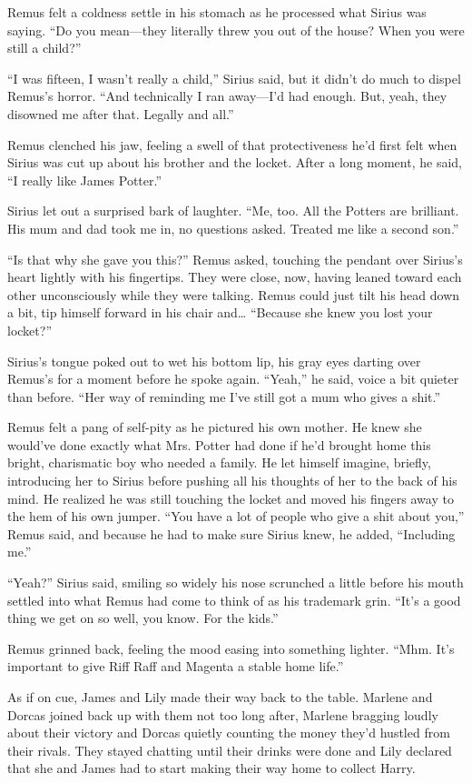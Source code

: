 Remus felt a coldness settle in his stomach as he processed what Sirius was saying. “Do you mean—they literally threw you out of the house? When you were still a child?”

“I was fifteen, I wasn’t really a child,” Sirius said, but it didn’t do much to dispel Remus’s horror. “And technically I ran away—I’d had enough. But, yeah, they disowned me after that. Legally and all.”

Remus clenched his jaw, feeling a swell of that protectiveness he’d first felt when Sirius was cut up about his brother and the locket. After a long moment, he said, “I really like James Potter.”

Sirius let out a surprised bark of laughter. “Me, too. All the Potters are brilliant. His mum and dad took me in, no questions asked. Treated me like a second son.”

“Is that why she gave you this?” Remus asked, touching the pendant over Sirius’s heart lightly with his fingertips. They were close, now, having leaned toward each other unconsciously while they were talking. Remus could just tilt his head down a bit, tip himself forward in his chair and… “Because she knew you lost your locket?”

Sirius’s tongue poked out to wet his bottom lip, his gray eyes darting over Remus’s for a moment before he spoke again. “Yeah,” he said, voice a bit quieter than before. “Her way of reminding me I’ve still got a mum who gives a shit.”

Remus felt a pang of self-pity as he pictured his own mother. He knew she would’ve done exactly what Mrs. Potter had done if he’d brought home this bright, charismatic boy who needed a family. He let himself imagine, briefly, introducing her to Sirius before pushing all his thoughts of her to the back of his mind. He realized he was still touching the locket and moved his fingers away to the hem of his own jumper. “You have a lot of people who give a shit about you,” Remus said, and because he had to make sure Sirius knew, he added, “Including me.”

“Yeah?” Sirius said, smiling so widely his nose scrunched a little before his mouth settled into what Remus had come to think of as his trademark grin. “It’s a good thing we get on so well, you know. For the kids.”

Remus grinned back, feeling the mood easing into something lighter. “Mhm. It’s important to give Riff Raff and Magenta a stable home life.”

As if on cue, James and Lily made their way back to the table. Marlene and Dorcas joined back up with them not too long after, Marlene bragging loudly about their victory and Dorcas quietly counting the money they’d hustled from their rivals. They stayed chatting until their drinks were done and Lily declared that she and James had to start making their way home to collect Harry.


